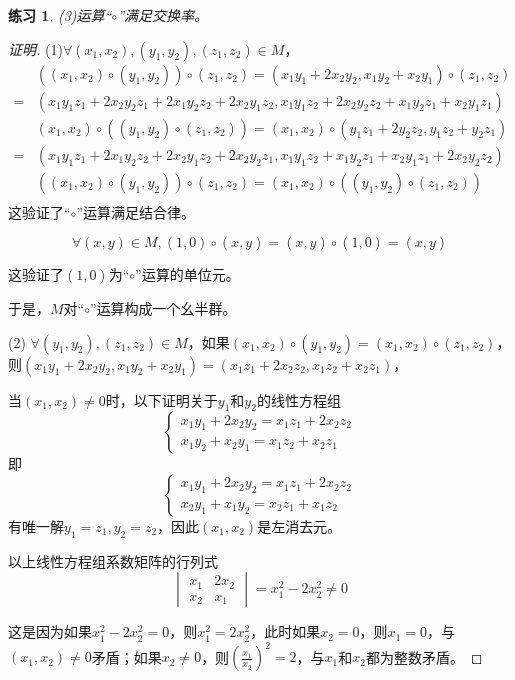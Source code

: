 \documentclass{article}
\newtheorem{Exercise}{练习}
\begin{document}
\begin{CJK*}{UTF8}{gbsn}
\begin{Exercise}
  (3)运算“$\circ$”满足交换率。
\end{Exercise}
\begin{proof}[证明]
  (1)$\forall (x_1,x_2), (y_1,y_2),(z_1,z_2)\in M$，
  \begin{align*}
    &((x_1,x_2)\circ (y_1,y_2))\circ (z_1,z_2) = (x_1y_1+2x_2y_2,x_1y_2+x_2y_1)\circ (z_1,z_2)\\
     =& (x_1y_1z_1+2x_2y_2z_1+2x_1y_2z_2+2x_2y_1z_2,x_1y_1z_2+2x_2y_2z_2+x_1y_2z_1+x_2y_1z_1)\\
     &(x_1,x_2)\circ ((y_1,y_2)\circ (z_1,z_2)) = (x_1,x_2)\circ (y_1z_1+2y_2z_2,y_1z_2+y_2z_1)\\
     =&(x_1y_1z_1+2x_1y_2z_2+2x_2y_1z_2+2x_2y_2z_1,x_1y_1z_2+x_1y_2z_1+x_2y_1z_1+2x_2y_2z_2)\\
  &((x_1,x_2)\circ (y_1,y_2))\circ (z_1,z_2) = (x_1,x_2)\circ ((y_1,y_2)\circ (z_1,z_2))\\
    \end{align*}
    这验证了“$\circ$”运算满足结合律。

  \[\forall (x,y)\in M,(1,0)\circ (x,y) = (x,y)\circ (1,0) = (x,y)\]
  
  这验证了$(1,0)$为“$\circ$”运算的单位元。
    
    
    于是，$M$对“$\circ$”运算构成一个幺半群。

(2) $\forall (y_1,y_2),(z_1,z_2)\in M$，如果$(x_1,x_2)\circ (y_1,y_2)=(x_1,x_2)\circ (z_1,z_2)$，
则$(x_1y_1+2x_2y_2,x_1y_2+x_2y_1)=(x_1z_1+2x_2z_2,x_1z_2+x_2z_1)$，

当$(x_1,x_2)\neq 0$时，以下证明关于$y_1$和$y_2$的线性方程组
\[
\begin{cases}
  x_1y_1+2x_2y_2=x_1z_1+2x_2z_2\\
  x_1y_2+x_2y_1=x_1z_2+x_2z_1
\end{cases}\]
即
\[
\begin{cases}
  x_1y_1+2x_2y_2=x_1z_1+2x_2z_2\\
  x_2y_1+x_1y_2=x_2z_1+x_1z_2
\end{cases}\]
有唯一解$y_1=z_1,y_2=z_2$，因此$(x_1,x_2)$是左消去元。

以上线性方程组系数矩阵的行列式
\[\begin{vmatrix}x_1&2x_2\\x_2&x_1\end{vmatrix}=x_1^2-2x_2^2\neq 0\]

这是因为如果$x_1^2-2x_2^2=0$，则$x_1^2=2x_2^2$，此时如果$x_2=0$，则$x_1=0$，与$(x_1,x_2)\neq 0$矛盾；如果$x_2\neq 0$，则$(\frac{x_1}{x_2})^2=2$，与$x_1$和$x_2$都为整数矛盾。


\end{proof}
\end{CJK*}
\end{document}
